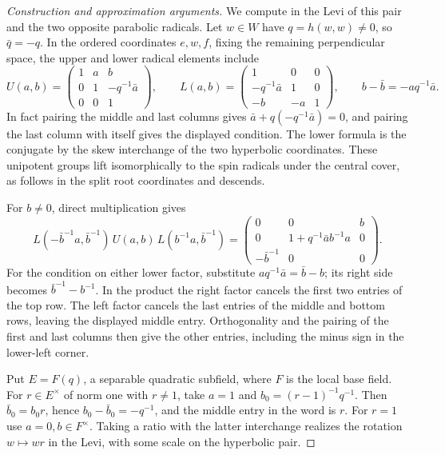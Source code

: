 \documentclass[11pt,a4paper,openany,oneside]{book}
\theoremstyle{resultstyle}
\theoremstyle{definition}
\numberwithin{equation}{chapter}
\begin{document}
\begin{proof}[Construction and approximation arguments]
We compute in the Levi of this pair and the
two opposite parabolic radicals. Let \(w\in W\)
have \(q=h(w,w)\ne0\), so \(\bar q=-q\).
In the ordered coordinates \(e,w,f\), fixing
the remaining perpendicular space, the upper
and lower radical elements include
\[
 U(a,b)=
 \begin{pmatrix}
 1&a&b\\0&1&-q^{-1}\bar a\\0&0&1
 \end{pmatrix},\qquad
 L(a,b)=
 \begin{pmatrix}
 1&0&0\\-q^{-1}\bar a&1&0\\-b&-a&1
 \end{pmatrix},
 \qquad b-\bar b=-a q^{-1}\bar a.
\]
In fact pairing the middle and last columns
gives \(\bar a+q(-q^{-1}\bar a)=0\),
and pairing the last column with itself gives
the displayed condition. The lower formula
is the conjugate by the skew interchange of
the two hyperbolic coordinates. These unipotent
groups lift isomorphically to the spin radicals
under the central cover, as follows in the
split root coordinates and descends.

For \(b\ne0\), direct multiplication gives
\[
 L(-\bar b^{-1}a,\bar b^{-1})\,U(a,b)\,
 L(b^{-1}a,\bar b^{-1})=
 \begin{pmatrix}
 0&0&b\\
 0&1+q^{-1}\bar a b^{-1}a&0\\
 -\bar b^{-1}&0&0
 \end{pmatrix}.
\]
For the condition on either lower factor,
substitute \(a q^{-1}\bar a=\bar b-b\);
its right side becomes \(\bar b^{-1}-b^{-1}\).
In the product the right factor cancels the
first two entries of the top row. The left
factor cancels the last entries of the middle
and bottom rows, leaving the displayed middle
entry. Orthogonality and the pairing of the
first and last columns then give the other
entries, including the minus sign in the
lower-left corner.

Put \(E=F(q)\), a separable quadratic subfield,
where \(F\) is the local base field. For
\(r\in E^\times\) of norm one with \(r\ne1\),
take \(a=1\) and \(b_0=(r-1)^{-1}q^{-1}\).
Then \(\bar b_0=b_0r\), hence
\(b_0-\bar b_0=-q^{-1}\), and the middle
entry in the word is \(r\). For \(r=1\)
use \(a=0,b\in F^\times\).
Taking a ratio with the latter interchange
realizes the rotation \(w\mapsto wr\)
in the Levi, with some scale on the
hyperbolic pair.


\end{proof}
\end{document}
